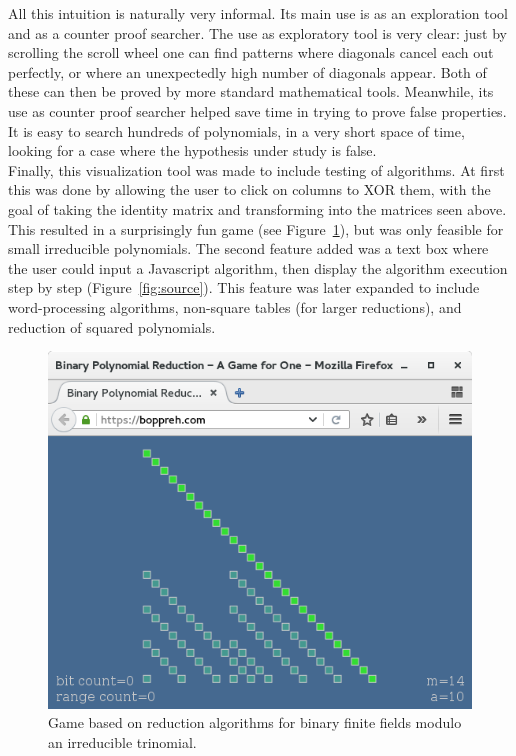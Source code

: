 All this intuition is naturally very informal. Its main use is as an exploration tool and as a counter proof searcher. The use as exploratory tool is very clear: just by scrolling the scroll wheel one can find patterns where diagonals cancel each out perfectly, or where an unexpectedly high number of diagonals appear. Both of these can then be proved by more standard mathematical tools. Meanwhile, its use as counter proof searcher helped save time in trying to prove false properties. It is easy to search hundreds of polynomials, in a very short space of time, looking for a case where the hypothesis under study is false. \\

Finally, this visualization tool was made to include testing of algorithms. At first this was done by allowing the user to click on columns to XOR them, with the goal of taking the identity matrix and transforming into the matrices seen above. This resulted in a surprisingly fun game (see Figure~\ref{fig:game}), but was only feasible for small irreducible polynomials. The second feature added was a text box where the user could input a Javascript algorithm, then display the algorithm execution step by step (Figure~\ref{fig:source}). This feature was later expanded to include word-processing algorithms, non-square tables (for larger reductions), and reduction of squared polynomials. \\

\begin{figure}
  \caption{Game based on reduction algorithms for binary finite fields modulo an irreducible trinomial.}
  \label{fig:game}
  \centering
  \includegraphics[width = .7\columnwidth]{figures/boppreh.png}
\end{figure}

